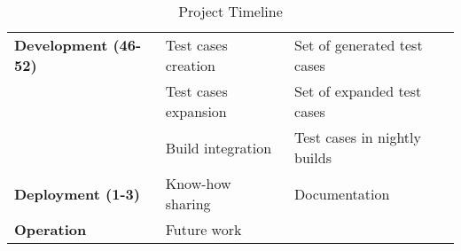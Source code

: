 \begin{table}[H]
\begin{tabular}{|l||l|l|}
    \textbf{Development (46-52)}         & Test cases creation                                                            & Set of generated test cases                                                   \\
                                         & Test cases expansion                                                           & Set of expanded test cases                                                    \\
                                         & Build integration                                                              & Test cases in nightly builds                                                  \\ \hline
    \textbf{Deployment (1-3)}            & Know-how sharing                                                               & Documentation                                                                 \\ \hline
    \textbf{Operation}                   & Future work                                                                    &                                                                               \\ \hline
    \end{tabular}
    
    \caption{Project Timeline}
    \label{Tab:projectTimeline}
\end{table}